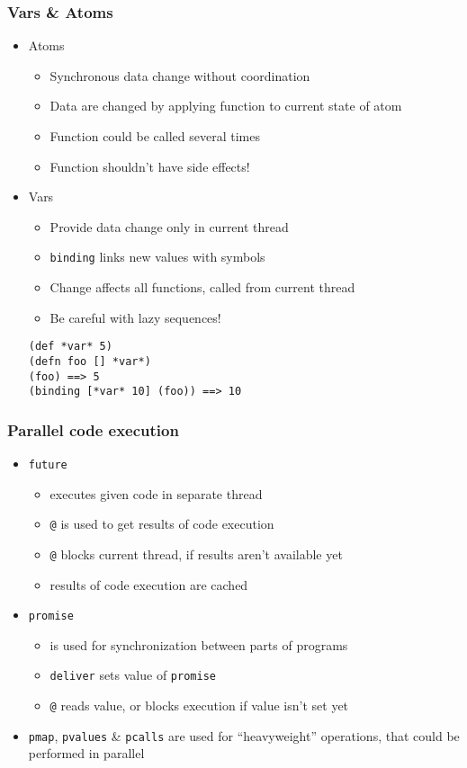 \begin{frame}[t,fragile]
  \frametitle{Vars \& Atoms}
  \begin{itemize}
  \item Atoms
    \begin{itemize}
    \item Synchronous data change without coordination
    \item Data are changed by applying function to current state of atom
    \item Function could be called several times
    \item Function shouldn't have side effects!
    \end{itemize}
  \item Vars
    \begin{itemize}
    \item Provide data change only in current thread
    \item \texttt{binding} links new values with symbols
    \item Change affects all functions, called from current thread
    \item Be careful with lazy sequences!
    \end{itemize}
\begin{lstlisting}
(def *var* 5)
(defn foo [] *var*)
(foo) ==> 5
(binding [*var* 10] (foo)) ==> 10
\end{lstlisting}
  \end{itemize}
\end{frame}

\begin{frame}[t,fragile]
  \frametitle{Parallel code execution}
  \begin{itemize}
  \item \texttt{future}
    \begin{itemize}
    \item executes given code in separate thread
    \item \lstinline|@| is used to get results of code execution
    \item \lstinline|@| blocks current thread, if results aren't available yet
    \item results of code execution are cached
    \end{itemize}
  \item \texttt{promise}
    \begin{itemize}
    \item is used for synchronization between parts of programs
    \item \texttt{deliver} sets value of \texttt{promise}
    \item \lstinline|@| reads value, or blocks execution if value isn't set yet
    \end{itemize}
  \item \texttt{pmap}, \texttt{pvalues} \& \texttt{pcalls} are used for
    ``heavyweight'' operations, that could be performed in parallel
  \end{itemize}
\end{frame}


